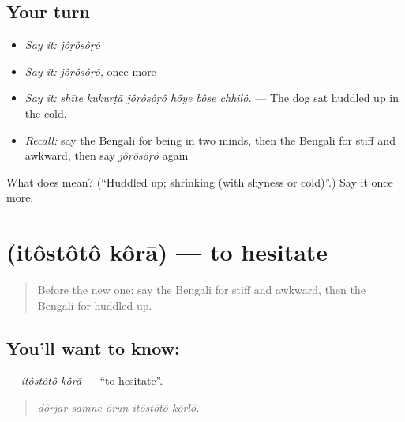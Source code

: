\subsection*{Your turn}
\begin{itemize}
\raggedright
  \item \emph{Say it:} \emph{jôṛôsôṛô}
  \item \emph{Say it:} \emph{jôṛôsôṛô}, once more
  \item \emph{Say it:} \emph{shīte kukurṭā jôṛôsôṛô hôye bôse chhilô.} — The dog sat huddled up in the cold.
  \item \emph{Recall:} say the Bengali for being in two minds, then the Bengali for stiff and awkward, then say \emph{jôṛôsôṛô} again
\end{itemize}

\begin{tcolorbox}[breakable,colback=teal!4,colframe=teal!35!black,title={Before you move on}]
What does  mean? (\textquotedblleft{}Huddled up; shrinking (with shyness or cold)\textquotedblright{}.) Say it once more.
\end{tcolorbox}
\section[\texorpdfstring{\bn{ইতস্তত} \bn{করা} (itôstôtô kôrā)}{ইতস্তত করা (itôstôtô kôrā)}]{  (itôstôtô kôrā) — to hesitate}

\label{lesson:BN-C454-itostoto-kora}



\begin{quote}
Before the new one: say the Bengali for stiff and awkward, then the Bengali for huddled up.
\end{quote}

\subsection*{You'll want to know:  }
\textbf{ } — \emph{itôstôtô kôrā} — \textquotedblleft{}to hesitate\textquotedblright{}.

\begin{quote}
    
\end{quote}

\begin{quote}
\emph{dôrjār sāmne ôrun itôstôtô kôrlô.}
\end{quote}

